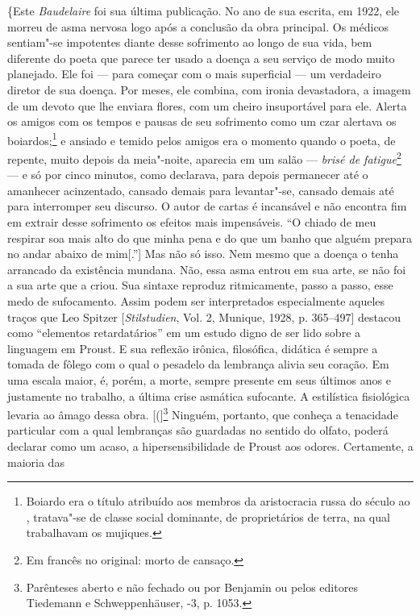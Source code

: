 \{Este \emph{Baudelaire} foi sua última publicação. No ano de sua
escrita, em 1922, ele morreu de asma nervosa logo após a conclusão da
obra principal. Os médicos sentiam"-se impotentes diante desse
sofrimento ao longo de sua vida, bem diferente do poeta que parece ter
usado a doença a seu serviço de modo muito planejado. Ele foi --- para
começar com o mais superficial --- um verdadeiro diretor de sua doença.
Por meses, ele combina, com ironia devastadora, a imagem de um devoto que
lhe enviara flores, com um cheiro insuportável para ele. Alerta os
amigos com os tempos e pausas de seu sofrimento como um czar alertava os
boiardos;\footnote{Boiardo era o título atribuído aos membros da
  aristocracia russa do século  ao , tratava"-se de classe social
  dominante, de proprietários de terra, na qual trabalhavam os mujiques. \versal{[N.~O.]}}
e ansiado e temido pelos amigos era o momento quando o poeta, de
repente, muito depois da meia"-noite, aparecia em um salão --- \emph{brisé
de fatigue}\footnote{Em francês no original: morto de cansaço. \versal{[N.~T.]}}
--- e só por cinco minutos, como declarava, para depois permanecer até o
amanhecer acinzentado, cansado demais para levantar"-se, cansado demais
até para interromper seu discurso. O autor de cartas é incansável e não
encontra fim em extrair desse sofrimento os efeitos mais impensáveis. ``O
chiado de meu respirar soa mais alto do que minha pena e do que um banho
que alguém prepara no andar abaixo de mim{[}.''{]} Mas não só isso. Nem
mesmo que a doença o tenha arrancado da existência mundana. Não, essa
asma entrou em sua arte, se não foi a sua arte que a criou. Sua sintaxe
reproduz ritmicamente, passo a passo, esse medo de sufocamento. Assim
podem ser interpretados especialmente aqueles traços que Leo Spitzer
{[}\emph{Stilstudien}, Vol. 2, Munique, 1928, p. 365--497{]} destacou como
``elementos retardatários'' em um estudo digno de ser lido sobre a
linguagem em Proust. E sua reflexão irônica, filosófica, didática é
sempre a tomada de fôlego com o qual o pesadelo da lembrança alivia seu
coração. Em uma escala maior, é, porém, a morte, sempre presente em seus
últimos anos e justamente no trabalho, a última crise asmática
sufocante. A estilística fisiológica levaria ao âmago dessa obra. {[}({]}\footnote{Parênteses aberto e não fechado ou por Benjamin ou pelos
  editores Tiedemann e Schweppenhäuser, -3, p. 1053. \versal{[N.~T.]}}
Ninguém, portanto, que conheça a tenacidade particular com a qual lembranças são
guardadas no sentido do olfato, poderá declarar como um acaso, a
hipersensibilidade de Proust aos odores. Certamente, a maioria das
